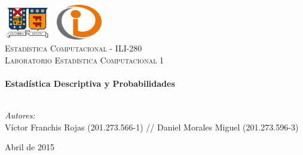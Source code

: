 \begin{titlepage}
\begin{center}

\includegraphics[width=0.15\textwidth]{./logoUSM}~\hspace{4cm}
\includegraphics[width=0.15\textwidth]{./logoDI}~\\[1.0cm]

\textsc{\LARGE Estad\'{i}stica Computacional - ILI-280}\\[1.5cm]

\textsc{\Large Laboratorio Estad\'{i}stica Computacional 1}\\[0.5cm]

\HRule \\[0.4cm]
{ \huge \bfseries Estad\'{i}stica Descriptiva y Probabilidades \\[0.4cm] }

\HRule \\[1.5cm]

\emph{Autores:}\\
V\'{i}ctor Franchis Rojas (201.273.566-1) //
Daniel Morales Miguel  (201.273.596-3)

\vfill

{\large Abril de 2015}

\end{center}
\end{titlepage}